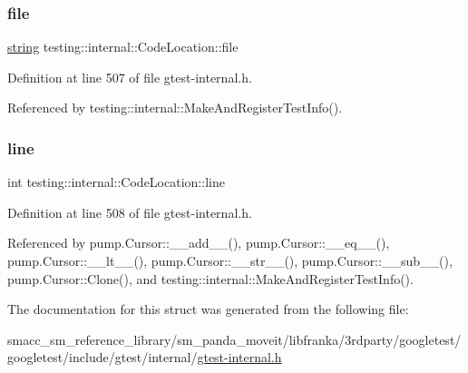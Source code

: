 \subsubsection{\texorpdfstring{file}{file}}
{\footnotesize\ttfamily \hyperlink{namespacetesting_1_1internal_a8e8ff5b11e64078831112677156cb111}{string} testing\+::internal\+::\+Code\+Location\+::file}



Definition at line 507 of file gtest-\/internal.\+h.



Referenced by testing\+::internal\+::\+Make\+And\+Register\+Test\+Info().

\mbox{\label{structtesting_1_1internal_1_1CodeLocation_a01c977c7e8834a05a6d6c40b0c416045}} 
\subsubsection{\texorpdfstring{line}{line}}
{\footnotesize\ttfamily int testing\+::internal\+::\+Code\+Location\+::line}



Definition at line 508 of file gtest-\/internal.\+h.



Referenced by pump.\+Cursor\+::\+\_\+\+\_\+add\+\_\+\+\_\+(), pump.\+Cursor\+::\+\_\+\+\_\+eq\+\_\+\+\_\+(), pump.\+Cursor\+::\+\_\+\+\_\+lt\+\_\+\+\_\+(), pump.\+Cursor\+::\+\_\+\+\_\+str\+\_\+\+\_\+(), pump.\+Cursor\+::\+\_\+\+\_\+sub\+\_\+\+\_\+(), pump.\+Cursor\+::\+Clone(), and testing\+::internal\+::\+Make\+And\+Register\+Test\+Info().



The documentation for this struct was generated from the following file\+:\begin{DoxyCompactItemize}
\item 
smacc\+\_\+sm\+\_\+reference\+\_\+library/sm\+\_\+panda\+\_\+moveit/libfranka/3rdparty/googletest/googletest/include/gtest/internal/\hyperlink{gtest-internal_8h}{gtest-\/internal.\+h}\end{DoxyCompactItemize}
